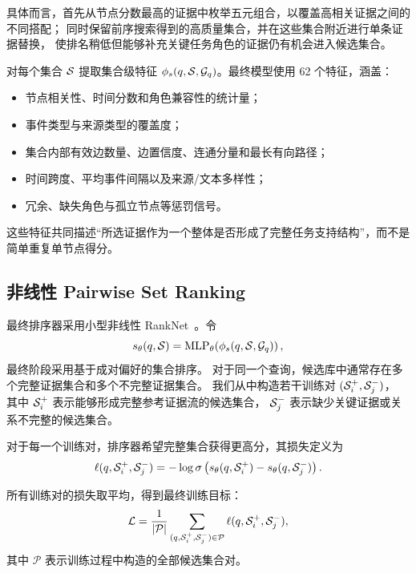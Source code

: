 具体而言，首先从节点分数最高的证据中枚举五元组合，以覆盖高相关证据之间的不同搭配；
同时保留前序搜索得到的高质量集合，并在这些集合附近进行单条证据替换，
使排名稍低但能够补充关键任务角色的证据仍有机会进入候选集合。

对每个集合 $\mathcal{S}$ 提取集合级特征 $\phi_s(q,\mathcal{S},\mathcal{G}_q)$。最终模型使用 62 个特征，涵盖：
\begin{itemize}
    \item 节点相关性、时间分数和角色兼容性的统计量；
    \item 事件类型与来源类型的覆盖度；
    \item 集合内部有效边数量、边置信度、连通分量和最长有向路径；
    \item 时间跨度、平均事件间隔以及来源/文本多样性；
    \item 冗余、缺失角色与孤立节点等惩罚信号。
\end{itemize}
这些特征共同描述“所选证据作为一个整体是否形成了完整任务支持结构”，而不是简单重复单节点得分。

\subsection{非线性 Pairwise Set Ranking}

最终排序器采用小型非线性 RankNet~\cite{burges2005ranknet}。令
\begin{equation}
s_{\theta}(q,\mathcal{S})
=
\operatorname{MLP}_{\theta}
\!\left(
\phi_s(q,\mathcal{S},\mathcal{G}_q)
\right),
\end{equation}
最终阶段采用基于成对偏好的集合排序。
对于同一个查询，候选库中通常存在多个完整证据集合和多个不完整证据集合。
我们从中构造若干训练对
$(\mathcal{S}_i^+,\mathcal{S}_j^-)$，
其中 $\mathcal{S}_i^+$ 表示能够形成完整参考证据流的候选集合，
$\mathcal{S}_j^-$ 表示缺少关键证据或关系不完整的候选集合。

对于每一个训练对，排序器希望完整集合获得更高分，其损失定义为
\begin{equation}
\ell(q,\mathcal{S}_i^+,\mathcal{S}_j^-)
=
-\log \sigma\left(
s_{\theta}(q,\mathcal{S}_i^+)
-
s_{\theta}(q,\mathcal{S}_j^-)
\right).
\label{eq:ranknet_pair_loss}
\end{equation}

所有训练对的损失取平均，得到最终训练目标：
\begin{equation}
\mathcal{L}
=
\frac{1}{|\mathcal{P}|}
\sum_{(q,\mathcal{S}_i^+,\mathcal{S}_j^-)\in\mathcal{P}}
\ell(q,\mathcal{S}_i^+,\mathcal{S}_j^-),
\label{eq:ranknet_loss}
\end{equation}
其中 $\mathcal{P}$ 表示训练过程中构造的全部候选集合对。

